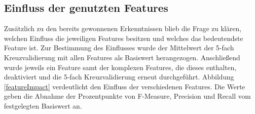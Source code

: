 \documentclass[12pt]{article}
\begin{document}
	\begin{table}[tb!]
		\centering
		\caption[Ergebnis der CoNLL-2009 Shared Task, SRL-only Task]{Ergebnis der CoNLL-2009 Shared Task, SRL-only Task. Die Angaben beziehen sich auf den erreichten F-Measure in Prozent. Fett hervorgehoben ist der jeweils beste Wert pro Sprache. \citep{hajivc2009conll}}
		\label{conll2009}
	\end{table}

\subsection{Einfluss der genutzten Features}

Zusätzlich zu den bereits gewonnenen Erkenntnissen blieb die Frage zu klären, welchen Einfluss die jeweiligen Features besitzen und welches das bedeutendste Feature ist. Zur Bestimmung des Einflusses wurde der Mittelwert der 5-fach Kreuzvalidierung mit allen Features als Basiswert herangezogen. Anschließend wurde jeweils ein Feature samt der komplexen Features, die dieses enthalten, deaktiviert und die 5-fach Kreuzvalidierung erneut durchgeführt. Abbildung \ref{featureImpact} verdeutlicht den Einfluss der verschiedenen Features. Die Werte geben die Abnahme der Prozentpunkte von F-Measure, Precision und Recall vom festgelegten Basiswert an.
\end{document}
